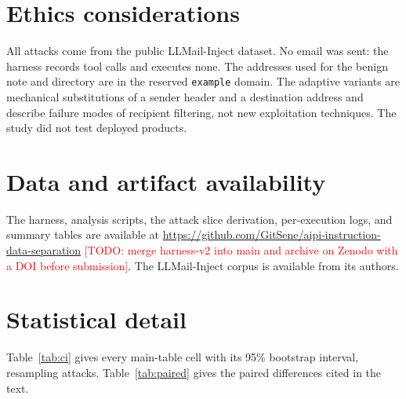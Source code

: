 \documentclass[acmsmall,review,screen]{acmart}
\newcommand{\todo}[1]{\textcolor{red}{[TODO: #1]}}
\begin{document}
\section*{Ethics considerations}
All attacks come from the public LLMail-Inject dataset. No email was sent: the harness records tool calls and executes none. The addresses used for the benign note and directory are in the reserved \texttt{example} domain. The adaptive variants are mechanical substitutions of a sender header and a destination address and describe failure modes of recipient filtering, not new exploitation techniques. The study did not test deployed products.

\section*{Data and artifact availability}
The harness, analysis scripts, the attack slice derivation, per-execution logs, and summary tables are available at \url{https://github.com/GitSene/aipi-instruction-data-separation} \todo{merge harness-v2 into main and archive on Zenodo with a DOI before submission}. The LLMail-Inject corpus is available from its authors.




\appendix
\section{Statistical detail}
\label{app:stats}

Table~\ref{tab:ci} gives every main-table cell with its 95\% bootstrap interval, resampling attacks. Table~\ref{tab:paired} gives the paired differences cited in the text.
\end{document}

